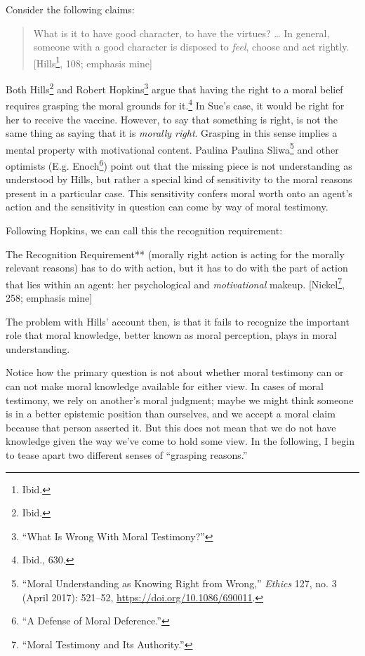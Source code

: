 \documentclass[phdthesis,12pt,final]{wuthesis}
\theoremstyle{definition}
\theoremstyle{definition}
\theoremstyle{definition}
\theoremstyle{definition}
\theoremstyle{remark}
\begin{document}
\noindent Consider the following claims:

\begin{quote}
What is it to have good character, to have the virtues? \ldots{} In general, someone with a good character is disposed to \emph{feel}, choose and act rightly. {[}Hills\footnote{Ibid.}, 108; emphasis mine{]}
\end{quote}

Both Hills\footnote{Ibid.} and Robert Hopkins\footnote{{``What {Is Wrong With Moral Testimony}?''}} argue that having the right to a moral belief requires grasping the moral grounds for it.\footnote{Ibid., 630.} In Sue's case, it would be right for her to receive the vaccine. However, to say that something is right, is not the same thing as saying that it is \emph{morally right}. Grasping in this sense implies a mental property with motivational content. Paulina Paulina Sliwa\footnote{{``Moral {Understanding} as {Knowing Right} from {Wrong},''} \emph{Ethics} 127, no. 3 (April 2017): 521--52, \url{https://doi.org/10.1086/690011}.} and other optimists (E.g. Enoch\footnote{{``A {Defense} of {Moral Deference}.''}}) point out that the missing piece is not understanding as understood by Hills, but rather a special kind of sensitivity to the moral reasons present in a particular case. This sensitivity confers moral worth onto an agent's action and the sensitivity in question can come by way of moral testimony.

Following Hopkins, we can call this the recognition requirement:

The Recognition Requirement** (morally right action is acting for the morally relevant reasons) has to do with action, but it has to do with the part of action that lies within an agent: her psychological and \emph{motivational} makeup. {[}Nickel\footnote{{``Moral {Testimony} and Its {Authority}.''}}, 258; emphasis mine{]}

The problem with Hills' account then, is that it fails to recognize the important role that moral knowledge, better known as moral perception, plays in moral understanding.

Notice how the primary question is not about whether moral testimony can or can not make moral knowledge available for either view. In cases of moral testimony, we rely on another's moral judgment; maybe we might think someone is in a better epistemic position than ourselves, and we accept a moral claim because that person asserted it. But this does not mean that we do not have knowledge given the way we've come to hold some view. In the following, I begin to tease apart two different senses of ``grasping reasons.''
\end{document}
